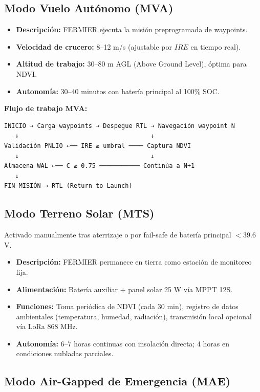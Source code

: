\subsection{Modo Vuelo Autónomo (MVA)}

\begin{itemize}
    \item \textbf{Descripción:} FERMIER ejecuta la misión preprogramada de waypoints.
    \item \textbf{Velocidad de crucero:} 8--12 m/s (ajustable por $IRE$ en tiempo real).
    \item \textbf{Altitud de trabajo:} 30--80 m AGL (Above Ground Level), óptima para NDVI.
    \item \textbf{Autonomía:} 30--40 minutos con batería principal al 100\% SOC.
\end{itemize}

\textbf{Flujo de trabajo MVA:}
\begin{verbatim}
INICIO → Carga waypoints → Despegue RTL → Navegación waypoint N
   ↓                                    ↓
Validación PNLIO ←── IRE ≥ umbral ──── Captura NDVI
   ↓                                    ↓
Almacena WAL ←── C ≥ 0.75 ─────────── Continúa a N+1
   ↓
FIN MISIÓN → RTL (Return to Launch)
\end{verbatim}

\subsection{Modo Terreno Solar (MTS)}

Activado manualmente tras aterrizaje o por fail-safe de batería principal $< 39.6$ V.

\begin{itemize}
    \item \textbf{Descripción:} FERMIER permanece en tierra como estación de monitoreo fija.
    \item \textbf{Alimentación:} Batería auxiliar + panel solar 25 W vía MPPT 12S.
    \item \textbf{Funciones:} Toma periódica de NDVI (cada 30 min), registro de datos ambientales (temperatura, humedad, radiación), transmisión local opcional vía LoRa 868 MHz.
    \item \textbf{Autonomía:} 6--7 horas continuas con insolación directa; 4 horas en condiciones nubladas parciales.
\end{itemize}

\subsection{Modo Air-Gapped de Emergencia (MAE)}

